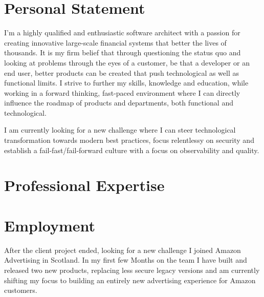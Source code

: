 \documentclass[11pt,a4paper]{my_cv}
\begin{document}
\begin{cvheader}
\end{cvheader}

\section{Personal Statement}
I'm a highly qualified and enthusiastic software architect with a passion for creating innovative large-scale financial systems that better the lives of thousands.
It is my firm belief that through questioning the status quo and looking at problems through the eyes of a customer, be that a developer or an end user, better products can be created that push technological as well as functional limits.
I strive to further my skills, knowledge and education, while working in a forward thinking, fast-paced environment where I can directly influence the roadmap of products and departments, both functional and technological.

I am currently looking for a new challenge where I can steer technological transformation towards modern best practices, focus relentlessy on security and establish a fail-fast/fail-forward culture with a focus on observability and quality.  

\section{Professional Expertise}
\begin{expertise}
\end{expertise}

\section{Employment}
After the client project ended, looking for a new challenge I joined Amazon Advertising in Scotland. In my first few Months on the team I have built and released two new products, replacing less secure legacy versions and am currently shifting my focus to building an entirely new advertising experience for Amazon customers. 
\end{document}
